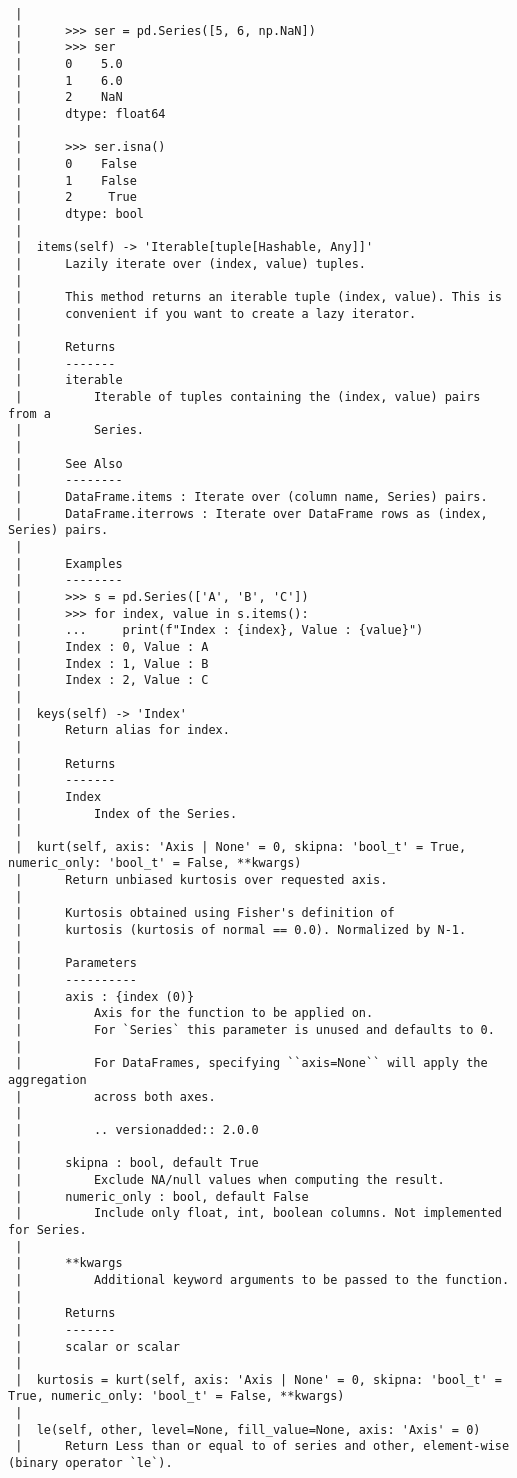 \documentclass[
  letterpaper,
  DIV=11,
  numbers=noendperiod]{scrreprt}
\begin{document}
\begin{verbatim}
 |      
 |      >>> ser = pd.Series([5, 6, np.NaN])
 |      >>> ser
 |      0    5.0
 |      1    6.0
 |      2    NaN
 |      dtype: float64
 |      
 |      >>> ser.isna()
 |      0    False
 |      1    False
 |      2     True
 |      dtype: bool
 |  
 |  items(self) -> 'Iterable[tuple[Hashable, Any]]'
 |      Lazily iterate over (index, value) tuples.
 |      
 |      This method returns an iterable tuple (index, value). This is
 |      convenient if you want to create a lazy iterator.
 |      
 |      Returns
 |      -------
 |      iterable
 |          Iterable of tuples containing the (index, value) pairs from a
 |          Series.
 |      
 |      See Also
 |      --------
 |      DataFrame.items : Iterate over (column name, Series) pairs.
 |      DataFrame.iterrows : Iterate over DataFrame rows as (index, Series) pairs.
 |      
 |      Examples
 |      --------
 |      >>> s = pd.Series(['A', 'B', 'C'])
 |      >>> for index, value in s.items():
 |      ...     print(f"Index : {index}, Value : {value}")
 |      Index : 0, Value : A
 |      Index : 1, Value : B
 |      Index : 2, Value : C
 |  
 |  keys(self) -> 'Index'
 |      Return alias for index.
 |      
 |      Returns
 |      -------
 |      Index
 |          Index of the Series.
 |  
 |  kurt(self, axis: 'Axis | None' = 0, skipna: 'bool_t' = True, numeric_only: 'bool_t' = False, **kwargs)
 |      Return unbiased kurtosis over requested axis.
 |      
 |      Kurtosis obtained using Fisher's definition of
 |      kurtosis (kurtosis of normal == 0.0). Normalized by N-1.
 |      
 |      Parameters
 |      ----------
 |      axis : {index (0)}
 |          Axis for the function to be applied on.
 |          For `Series` this parameter is unused and defaults to 0.
 |      
 |          For DataFrames, specifying ``axis=None`` will apply the aggregation
 |          across both axes.
 |      
 |          .. versionadded:: 2.0.0
 |      
 |      skipna : bool, default True
 |          Exclude NA/null values when computing the result.
 |      numeric_only : bool, default False
 |          Include only float, int, boolean columns. Not implemented for Series.
 |      
 |      **kwargs
 |          Additional keyword arguments to be passed to the function.
 |      
 |      Returns
 |      -------
 |      scalar or scalar
 |  
 |  kurtosis = kurt(self, axis: 'Axis | None' = 0, skipna: 'bool_t' = True, numeric_only: 'bool_t' = False, **kwargs)
 |  
 |  le(self, other, level=None, fill_value=None, axis: 'Axis' = 0)
 |      Return Less than or equal to of series and other, element-wise (binary operator `le`).

\end{verbatim}
\end{document}
